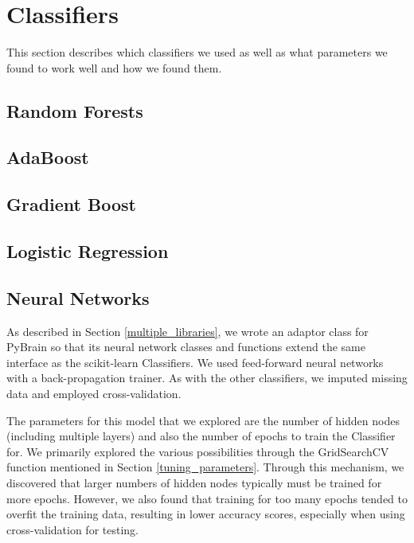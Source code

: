 \documentclass{article}
\begin{document}

\section{Classifiers}

This section describes which classifiers we used as well as what parameters we found to work well and how we found them.
 
\subsection{Random Forests}

\subsection{AdaBoost}

\subsection{Gradient Boost}

\subsection{Logistic Regression}

\subsection{Neural Networks}

As described in Section \ref{multiple_libraries}, we wrote an adaptor class for PyBrain so that its neural network classes and functions extend the same interface as the scikit-learn Classifiers.
We used feed-forward neural networks with a back-propagation trainer.
As with the other classifiers, we imputed missing data and employed cross-validation.

The parameters for this model that we explored are the number of hidden nodes (including multiple layers) and also the number of epochs to train the Classifier for.
We primarily explored the various possibilities through the GridSearchCV function mentioned in Section \ref{tuning_parameters}.
Through this mechanism, we discovered that larger numbers of hidden nodes typically must be trained for more epochs.
However, we also found that training for too many epochs tended to overfit the training data, resulting in lower accuracy scores, especially when using cross-validation for testing.
\end{document}
